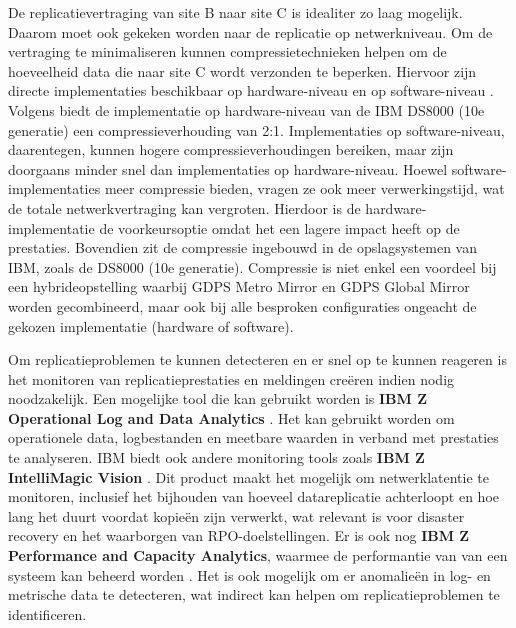 De replicatievertraging van site B naar site C is idealiter zo laag mogelijk.
Daarom moet ook gekeken worden naar de replicatie op netwerkniveau.
Om de vertraging te minimaliseren kunnen compressietechnieken helpen om de hoeveelheid data die naar site C wordt verzonden te beperken.
Hiervoor zijn directe implementaties beschikbaar op hardware-niveau en op software-niveau \autocite{clayton_2016_ds8000}.
Volgens \textcite{ecklund_2024_unlocking} biedt de implementatie op hardware-niveau van de IBM DS8000 (10e generatie) een compressieverhouding van 2:1.
Implementaties op software-niveau, daarentegen, kunnen hogere compressieverhoudingen bereiken, maar zijn doorgaans minder snel dan implementaties op hardware-niveau.
Hoewel software-implementaties meer compressie bieden, vragen ze ook meer verwerkingstijd, wat de totale netwerkvertraging kan vergroten.
Hierdoor is de hardware-implementatie de voorkeursoptie omdat het een lagere impact heeft op de prestaties.
Bovendien zit de compressie ingebouwd in de opslagsystemen van IBM, zoals de DS8000 (10e generatie).
Compressie is niet enkel een voordeel bij een hybrideopstelling waarbij GDPS Metro Mirror en GDPS Global Mirror worden gecombineerd, maar ook bij alle besproken configuraties ongeacht de gekozen implementatie (hardware of software).

Om replicatieproblemen te kunnen detecteren en er snel op te kunnen reageren is het monitoren van replicatieprestaties en meldingen creëren indien nodig noodzakelijk.
Een mogelijke tool die kan gebruikt worden is \textbf{IBM Z Operational Log and Data Analytics} \autocite{ibm_2026_z_operational_log_data_analytics_overview}.
Het kan gebruikt worden om operationele data, logbestanden en meetbare waarden in verband met prestaties te analyseren.
IBM biedt ook andere monitoring tools zoals \textbf{IBM Z IntelliMagic Vision} \autocite{ibm_2026_zos_virtual_tape_performance_management_z_intellimagic_vision}.
Dit product maakt het mogelijk om netwerklatentie te monitoren, inclusief het bijhouden van hoeveel datareplicatie achterloopt en hoe lang het duurt voordat kopieën zijn verwerkt, wat relevant is voor disaster recovery en het waarborgen van RPO-doelstellingen.
Er is ook nog \textbf{IBM Z Performance and Capacity Analytics}, waarmee de performantie van van een systeem kan beheerd worden \autocite{ibm_2026_ibm_z_performance_and_capacity_analytics}.
Het is ook mogelijk om er anomalieën in log- en metrische data te detecteren, wat indirect kan helpen om replicatieproblemen te identificeren.

\section{}%
\label{sec:risico-analyse-asynchrone-log-replicatie}

